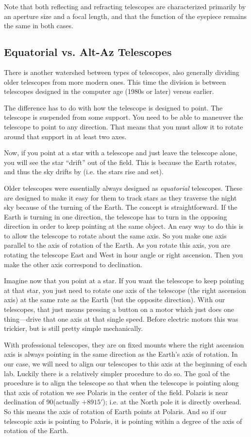 \documentclass[12pt, preprint]{aastex}
\begin{document}
Note that both reflecting and refracting telescopes are characterized
primarily by an aperture size and a focal length, and that the
function of the eyepiece remains the same in both cases.

\subsection{Equatorial vs. Alt-Az Telescopes}

There is another watershed between types of telescopes, also generally
dividing older telescopes from more modern ones. This time the
division is between telescopes designed in the computer age (1980s or
later) versus earlier.

The difference has to do with how the telescope is designed to
point. The telescope is suspended from some support. You need to be
able to maneuver the telescope to point to any direction. That means
that you must allow it to rotate around that support in at least two
axes.

Now, if you point at a star with a telescope and just leave the
telescope alone, you will see the star ``drift'' out of the
field. This is because the Earth rotates, and thus the sky drifts by
(i.e. the stars rise and set).

Older telescopes were essentially always designed as {\it equatorial}
telescopes. These are designed to make it easy for them to track stars
as they traverse the night sky because of the turning of the
Earth. The concept is straightforward. If the Earth is turning in one
direction, the telescope has to turn in the opposing direction in
order to keep pointing at the same object. An easy way to do this is
to allow the telescope to rotate about the same axis.  So you make one
axis parallel to the axis of rotation of the Earth. As you rotate this
axis, you are rotating the telescope East and West in hour angle or
right ascension.  Then you make the other axis correspond to
declination.

Imagine now that you point at a star. If you want the telescope to
keep pointing at that star, you just need to rotate one axis of the
telescope (the right ascension axis) at the same rate as the Earth
(but the opposite direction). With our telescopes, that just means
pressing a button on a motor which just does one thing---drive that
one axis at that single speed. Before electric motors this was
trickier, but is still pretty simple mechanically. 

With professional telescopes, they are on fixed mounts where the right
ascension axis is always pointing in the same direction as the Earth's
axis of rotation. In our case, we will need to align our telescopes to
this axis at the beginning of each lab. Luckily there is a relatively
simpler procedure to do so. The goal of the procedure is to align the
telescope so that when the telescope is pointing along that axis of
rotation we see Polaris in the center of the field. Polaris is near
declination of 90\degree (actually $+$89\degree $15'$); i.e. at the
North pole it is directly overhead. So this means the axis of rotation
of Earth points at Polaris. And so if our telescopic axis is pointing
to Polaris, it is pointing within a degree of the axis of rotation of
the Earth.
\end{document}
